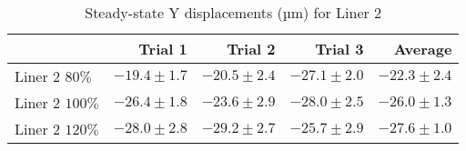 \begin{table}[htbp!]
\centering
\begin{tabular}{lrrrr}
\toprule
  & Trial 1 & Trial 2 & Trial 3 & Average \\
\midrule
 Liner 2 $80\%$ & $-19.4 \pm 1.7$ & $-20.5 \pm 2.4$ & $-27.1 \pm 2.0$ & $-22.3 \pm 2.4$ \\
 Liner 2 $100\%$ & $-26.4 \pm 1.8$ & $-23.6 \pm 2.9$ & $-28.0 \pm 2.5$ & $-26.0 \pm 1.3$ \\
 Liner 2 $120\%$ & $-28.0 \pm 2.8$ & $-29.2 \pm 2.7$ & $-25.7 \pm 2.9$ & $-27.6 \pm 1.0$ \\
\bottomrule
\end{tabular}
\caption{Steady-state Y displacements (µm) for Liner 2}
\label{fig:liner_2_results_table}
\end{table}